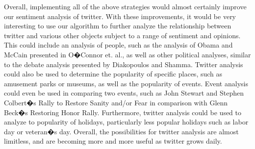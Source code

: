 \documentclass[11pt]{article}
\begin{document}
Overall, implementing all of the above strategies would almost certainly improve our sentiment analysis of twitter.  With these improvements, it would be very interesting to use our algorithm to further analyze the relationship  between twitter and various other objects subject to a range of sentiment and opinions.  This could include an analysis of people, such as the analysis of Obama and McCain presented in O�Connor et. al., as well as other political analyses, similar to the debate analysis presented by Diakopoulos and Shamma.  Twitter analysis could also be used to determine the popularity of specific places, such as amusement parks or museums, as well as the popularity of events.  Event analysis could even be used in comparing two events, such as John Stewart and Stephen Colbert�s Rally to Restore Sanity and/or Fear in comparison with Glenn Beck�s Restoring Honor Rally.  Furthermore, twitter analysis could be used to analyze to popularity of holidays, particularly less popular holidays such as labor day or veteran�s day.  Overall, the possibilities for twitter analysis are almost limitless, and are becoming more and more useful as twitter grows daily.











\end{document}
